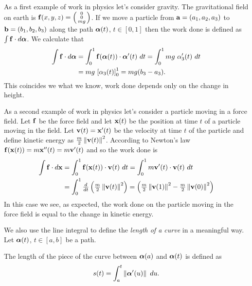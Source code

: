 As a first example of work in physics let's consider gravity.
The gravitational field on earth is \(\ff(x,y,z) = \left(\begin{smallmatrix}
        0 \\ 0 \\ mg
    \end{smallmatrix}\right)\).
If we move a particle from \(\aa=(a_1,a_2,a_3)\) to \(\bb=(b_1,b_2,b_3)\) along the path \(\aalpha(t)\), \(t\in [0,1]\)
then the work done is defined as \(\int \ff \cdot d\aalpha\).
We calculate that
\[
    \begin{aligned}
        \int \ff \cdot d\aalpha
         & = \int_0^1 \ff(\aalpha(t)) \cdot \aalpha'(t) \ dt
        = \int_0^1 mg \ \alpha_3'(t) \ dt                          \\
         & = mg \ {\left[ \alpha_3(t)\right]}_0^1 = mg(b_3 - a_3).
    \end{aligned}
\]
This coincides we what we know, work done depends only on the change in height.

As a second example of work in physics let's consider a particle moving in a force field.
Let \(\ff\) be the force field and let \(\xx(t)\) be the position at time \(t\) of a particle moving in the field.
Let \(\vv(t) = \xx'(t)\) be the velocity at time \(t\) of the particle and define kinetic energy as \(\frac{m}{2} \norm{\vv(t)}^2\).
According to Newton's law
\(\ff(\xx(t)) = m\xx''(t) = m \vv'(t)\)
and so the work done is
\[
    \begin{aligned}
        \int \ff \cdot d\xx
         & = \int_0^1 \ff(\xx(t)) \cdot \vv(t) \ dt
        = \int_0^1 m\vv'(t) \cdot \vv(t) \ dt                                   \\
         & = \int_0^1 \tfrac{d}{dt} \left( \tfrac{m}{2} \norm{\vv(t)}^2 \right)
        = \left(  \tfrac{m}{2} \norm{\vv(1)}^2  -  \tfrac{m}{2} \norm{\vv(0)}^2   \right)
    \end{aligned}
\]
In this case we see, as expected, the work done on the particle moving in the force field is equal to the change in kinetic energy.

We also use the line integral to define the \emph{length of a curve} in a meaningful way.
Let \(\aalpha(t)\), \(t\in [a,b]\) be a path.
\begin{definition}
    The length of the piece of the curve between \(\aalpha(a)\) and \(\aalpha(t)\) is defined as
    \[
        s(t) = \int_a^t \norm{\aalpha'(u)} \ du.
    \]
\end{definition}

